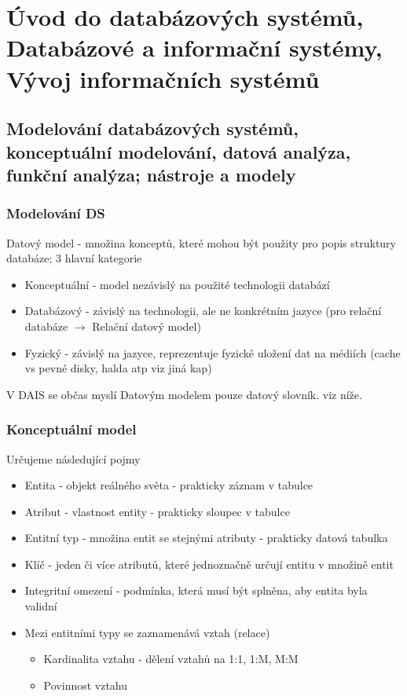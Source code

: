 \documentclass[10pt,a4paper]{article}
\begin{document}
\newpage
\section{Úvod do databázových systémů, Databázové a informační systémy, Vývoj informačních systémů}
\subsection{Modelování databázových systémů, konceptuální modelování, datová analýza, funkční analýza; nástroje a modely}
\subsubsection{Modelování DS}
Datový model - množina konceptů, které mohou být použity pro popis struktury databáze; 3 hlavní kategorie
\begin{itemize}
\item Konceptuální - model nezávislý na použité technologii databází
\item Databázový - závislý na technologii, ale ne konkrétním jazyce (pro relační databáze $\rightarrow$ Relační datový model)
\item Fyzický - závislý na jazyce, reprezentuje fyzické uložení dat na médiích (cache vs pevné disky, halda atp viz jiná kap)
\end{itemize}
V DAIS se občas myslí Datovým modelem pouze datový slovník. viz níže.
\subsubsection{Konceptuální model}
Určujeme následující pojmy
\begin{itemize}
\item Entita - objekt reálného světa - prakticky záznam v tabulce
\item Atribut - vlastnost entity - prakticky sloupec v tabulce
\item Entitní typ - množina entit se stejnými atributy - prakticky datová tabulka
\item Klíč - jeden či více atributů, které jednoznačně určují entitu v množině entit
\item Integritní omezení - podmínka, která musí být splněna, aby entita byla validní
\item Mezi entitními typy se zaznamenává vztah (relace)
\begin{itemize}
\item Kardinalita vztahu - dělení vztahů na 1:1, 1:M, M:M
\item Povinnost vztahu
\end{itemize}
\end{itemize}
\end{document}
